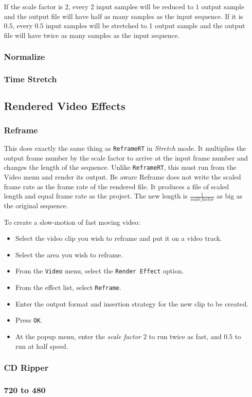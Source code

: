 If the scale factor is $2$, every $2$ input samples will be reduced to $1$ output sample and the output file will have half as many samples as the input sequence. If it is $0.5$, every $0.5$ input samples will be stretched to 1 output sample and the output file will have twice as many samples as the input sequence.

\subsubsection*{Normalize}%
\label{ssub:normalize}

\subsubsection*{Time Stretch}%
\label{ssub:time_stretch}

\subsection{Rendered Video Effects}%
\label{sub:renederd_video_effets}

\subsubsection*{Reframe}%
\label{ssub:time_stretch}

This does exactly the same thing as \texttt{ReframeRT} in \textit{Stretch} mode. It multiplies the output frame number by the scale factor to arrive at the input frame number and changes the length of the sequence. Unlike \texttt{ReframeRT}, this must run from the Video menu and render its output. Be aware Reframe does not write the scaled frame rate as the frame rate of the rendered file. It produces a file of scaled length and equal frame rate as the project. The new length is $\frac{1}{scale factor}$ as big as the original sequence.

To create a slow-motion of fast moving video:

\begin{itemize}
    \item Select the video clip you wish to reframe and put it on a video track.
    \item Select the area you wish to reframe.
    \item From the \texttt{Video} menu, select the \texttt{Render Effect} option.
    \item From the effect list, select \texttt{Reframe}.
    \item Enter the output format and insertion strategy for the new clip to be created.
    \item Press \texttt{OK}.
    \item At the popup menu, enter the \textit{scale factor} $2$ to run twice as fast, and $0.5$ to run at half speed.
\end{itemize}

\subsubsection*{CD Ripper}%
\label{ssub:cd_ripper}

\subsubsection*{720 to 480}%
\label{ssub:720_to_480}

